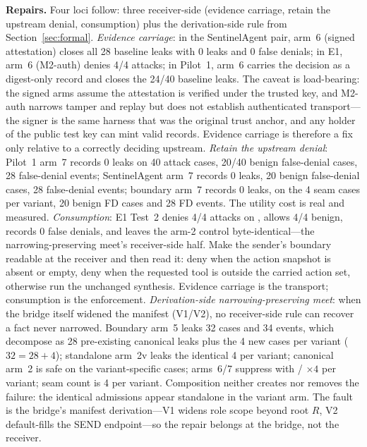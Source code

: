\documentclass[sigconf,anonymous,nonacm]{acmart}
\newcommand{\code}[1]{\texttt{\detokenize{#1}}}
\begin{document}
\textbf{Repairs.} Four loci follow: three receiver-side (evidence carriage, retain the upstream denial, consumption) plus the derivation-side rule from Section~\ref{sec:formal}. \emph{Evidence carriage}: in the SentinelAgent pair, arm~6 (signed attestation) closes all 28 baseline leaks with 0 leaks and 0 false denials; in E1, arm~6 (M2-auth) denies 4/4 attacks; in Pilot~1, arm~6 carries the decision as a digest-only record and closes the 24/40 baseline leaks. The caveat is load-bearing: the signed arms assume the attestation is verified under the trusted key, and M2-auth narrows tamper and replay but does not establish authenticated transport---the signer is the same harness that was the original trust anchor, and any holder of the public test key can mint valid records. Evidence carriage is therefore a fix only relative to a correctly deciding upstream. \emph{Retain the upstream denial}: Pilot~1 arm~7 records 0 leaks on 40 attack cases, 20/40 benign false-denial cases, 28 false-denial events; SentinelAgent arm~7 records 0 leaks, 20 benign false-denial cases, 28 false-denial events; boundary arm~7 records 0 leaks, \code{SHADOW-DENY} on the 4 seam cases per variant, 20 benign FD cases and 28 FD events. The utility cost is real and measured. \emph{Consumption}: E1 Test~2 denies 4/4 attacks on \code{ACTION-SCOPE}, allows 4/4 benign, records 0 false denials, and leaves the arm-2 control byte-identical---the narrowing-preserving meet's receiver-side half. Make the sender's boundary readable at the receiver and then read it: deny when the action snapshot is absent or empty, deny when the requested tool is outside the carried action set, otherwise run the unchanged synthesis. Evidence carriage is the transport; consumption is the enforcement. \emph{Derivation-side narrowing-preserving meet}: when the bridge itself widened the manifest (V1/V2), no receiver-side rule can recover a fact never narrowed. Boundary arm~5 leaks 32 cases and 34 events, which decompose as 28 pre-existing canonical leaks plus the 4 new cases per variant ($32=28+4$); standalone arm~2v leaks the identical 4 per variant; canonical arm~2 is safe on the variant-specific cases; arms~6/7 suppress with \code{APC-DENY}/\code{SHADOW-DENY} $\times4$ per variant; seam count is 4 per variant. Composition neither creates nor removes the failure: the identical admissions appear standalone in the variant arm. The fault is the bridge's manifest derivation---V1 widens role scope beyond root $R$, V2 default-fills the SEND endpoint---so the repair belongs at the bridge, not the receiver.
\end{document}
